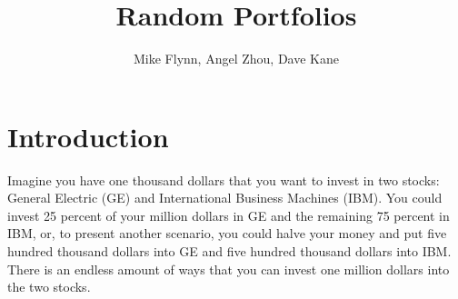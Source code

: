 \documentclass{article}\usepackage{graphicx, color}
\begin{document}
\title{Random Portfolios}
\author{Mike Flynn, Angel Zhou, Dave Kane}
\maketitle

\section*{Introduction}




Imagine you have one thousand dollars that you want to invest in two stocks: General Electric (GE) and International Business Machines (IBM). You could invest 25 percent of your million dollars in GE and the remaining 75 percent in IBM, or, to present another scenario, you could halve your money and put five hundred thousand dollars into GE and five hundred thousand dollars into IBM. There is an endless amount of ways that you can invest one million dollars into the two stocks.
\end{document}

